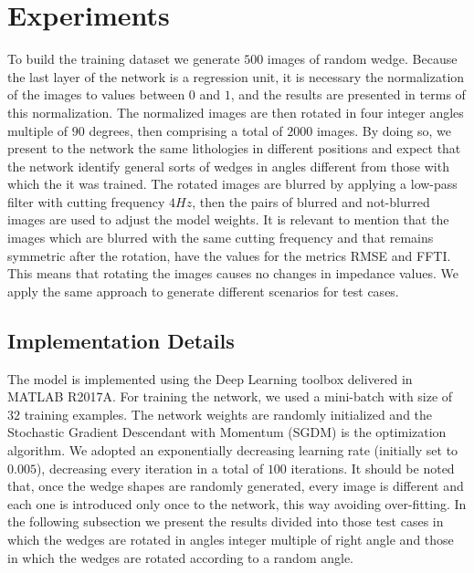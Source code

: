 \documentclass[conference,compsoc]{IEEEtran}
\begin{document}
\section{Experiments}
To build the training dataset we generate $500$ images of random wedge.
Because the last layer of the network is a regression unit, it is necessary the
normalization of the images to values between $0$ and $1$, and the results
are presented in terms of this normalization.
The normalized images are then rotated in four integer angles multiple of $90$
degrees, then comprising a total of $2000$ images. By doing so, we present to
the network the same lithologies in different positions and expect that the network
identify general sorts of wedges in angles different from those with which the it was trained.
The rotated images are blurred by applying a low-pass filter with
cutting frequency $4Hz$, then the pairs of blurred and not-blurred images are used to
adjust the model weights. It is relevant to mention that the images which are blurred with
the same cutting frequency and that remains symmetric after the rotation,
have the values for the metrics RMSE and FFTI. This means that rotating the images causes no changes in impedance values.
We apply the same approach to generate different scenarios for test cases.

\subsection{Implementation Details}
The model is implemented using the Deep Learning toolbox
delivered in MATLAB R2017A. For training the network, we used a mini-batch with size of $32$ training examples.
The network weights are randomly initialized and the Stochastic Gradient Descendant with
Momentum (SGDM) \cite{Ning} is the optimization algorithm.
We adopted an exponentially decreasing learning rate (initially
set to $0.005$), decreasing every iteration in a total of $100$ iterations.
It should be noted that, once the wedge shapes are randomly generated, every image is different
and each one is introduced only once to the network, this way avoiding over-fitting.
In the following subsection we present the results divided into those test cases in which the wedges are
rotated in angles integer multiple of right angle and those in which the wedges are rotated according
to a random angle.
\end{document}
